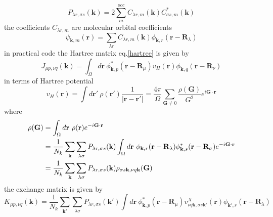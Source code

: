 \documentclass{article}
\begin{document}
            \begin{equation}
                P_{\lambda r,\sigma s}(\textbf{k}) = 2\sum_m^{occ}C_{\lambda r,m}(\textbf{k})C_{\sigma s,m}^*(\textbf{k})
            \end{equation}
            the coefficients $C_{\lambda r,m}$ are molecular orbital coefficients
            \begin{equation}
                \psi_{\textbf{k},m}(\textbf{r}) = \sum_{\lambda r}C_{\lambda r,m}(\textbf{k})\phi_{\textbf{k},r}(\textbf{r}-\textbf{R}_{\lambda})
            \end{equation} 
            in practical code the Hartree matrix eq.\eqref{hartree} is given by
            \begin{equation}
                J_{\mu p,\nu q}(\textbf{k}) = \int_{\Omega}d\textbf{r}\ \phi_{\textbf{k},p}^*(\textbf{r}-\textbf{R}_{\mu})v_H(\textbf{r})\phi_{\textbf{k},q}(\textbf{r}-\textbf{R}_{\nu})\label{hartree_code}
            \end{equation}
            in terms of Hartree potential
            \begin{equation}
                v_H(\textbf{r}) = \int d\textbf{r}'\ \rho(\textbf{r}')\frac{1}{\left|\textbf{r}-\textbf{r}'\right|} = \frac{4\pi}{\Omega}\sum_{\textbf{G}\neq 0}\frac{\rho(\textbf{G})}{G^2}e^{i\textbf{G}\cdot\textbf{r}}
            \end{equation}
            where
            \begin{align}
                \rho(\textbf{G}) &= \int_{\Omega}d\textbf{r}\ \rho(\textbf{r})e^{-i\textbf{G}\cdot\textbf{r}}\notag\\
                &= \frac{1}{N_k}\sum_{\textbf{k}}\sum_{\lambda\sigma}P_{\lambda r,\sigma s}(\textbf{k})\int_{\Omega}d\textbf{r}\ \phi_{\textbf{k},r}(\textbf{r}-\textbf{R}_{\lambda})\phi_{\textbf{k},s}^*(\textbf{r}-\textbf{R}_{\sigma})e^{-i\textbf{G}\cdot\textbf{r}}\notag\\
                &= \frac{1}{N_k}\sum_{\textbf{k}}\sum_{\lambda\sigma}P_{\lambda r,\sigma s}(\textbf{k})\rho_{\sigma s\textbf{k},\nu q\textbf{k}}(\textbf{G})
            \end{align}
            the exchange matrix is given by
            \begin{equation}
                K_{\mu p,\nu q}(\textbf{k}) = \frac{1}{N_k}\sum_{\textbf{k}'}\sum_{\lambda\sigma}P_{\lambda r,\sigma s}(\textbf{k}')\int d\textbf{r}\ \phi_{\textbf{k},p}^*(\textbf{r}-\textbf{R}_{\mu})v_{\nu q\textbf{k},\sigma s\textbf{k}'}^X(\textbf{r})\phi_{\textbf{k}',r}(\textbf{r}-\textbf{R}_{\lambda})
            \end{equation}
\end{document}
